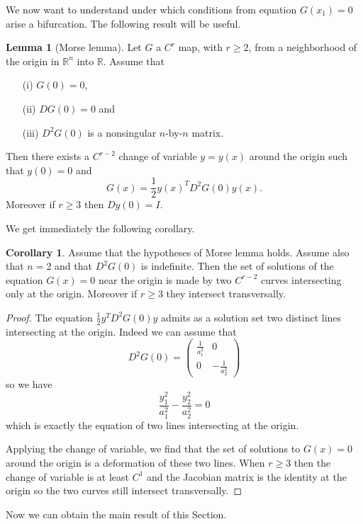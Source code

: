 \documentclass[a4paper,11pt]{article}
\theoremstyle{definition}
\newtheorem{cor}[prop]{Corollary}
\newtheorem{lemma}[prop]{Lemma}
\begin{document}
We now want to understand under which conditions from equation $G(x_1)=0$ arise a bifurcation. The following result will be useful.
\begin{lemma}[Morse lemma]
Let $G$ a $C^r$ map, with $r\ge2$, from a neighborhood of the origin in $\mathbb{R}^n$ into $\mathbb{R}$. Assume that
\begin{itemize}
\item[(i)] $G(0)=0$,
\item[(ii)] $DG(0)=0$ and
\item[(iii)] $D^2G(0)$ is a nonsingular $n$-by-$n$ matrix.
\end{itemize}
Then there exists a $C^{r-2}$ change of variable $y=y(x)$ around the origin such that $y(0)=0$ and
\[
G(x)=\frac{1}{2}y(x)^TD^2G(0)y(x).
\]
Moreover if $r\ge3$ then $Dy(0)=I$.
\end{lemma}
We get immediately the following corollary.
\begin{cor}
\label{cor:cor-morse}
Assume that the hypotheses of Morse lemma holds. Assume also that $n=2$ and that $D^2G(0)$ is indefinite. Then the set of solutions of the equation $G(x)=0$ near the origin is made by two $C^{r-2}$ curves intersecting only at the origin. Moreover if $r\ge3$ they intersect transversally.
\end{cor}
\begin{proof}
The equation $\frac{1}{2}y^TD^2G(0)y$ admits as a solution set two distinct lines intersecting at the origin. Indeed we can assume that
\[
D^2G(0)=
\begin{pmatrix}
\frac{1}{a_1^2} & 0 \\
0 & -\frac{1}{a_2^2}
\end{pmatrix}
\]
so we have
\[
\frac{y_1^2}{a_1^2}-\frac{y_2^2}{a_2^2}=0
\]
which is exactly the equation of two lines intersecting at the origin.

Applying the change of variable, we find that the set of solutions to $G(x)=0$ around the origin is a deformation of these two lines. When $r\ge3$ then the change of variable is at least $C^1$ and the Jacobian matrix is the identity at the origin so the two curves still intersect transversally.
\end{proof}
Now we can obtain the main result of this Section.
\end{document}
